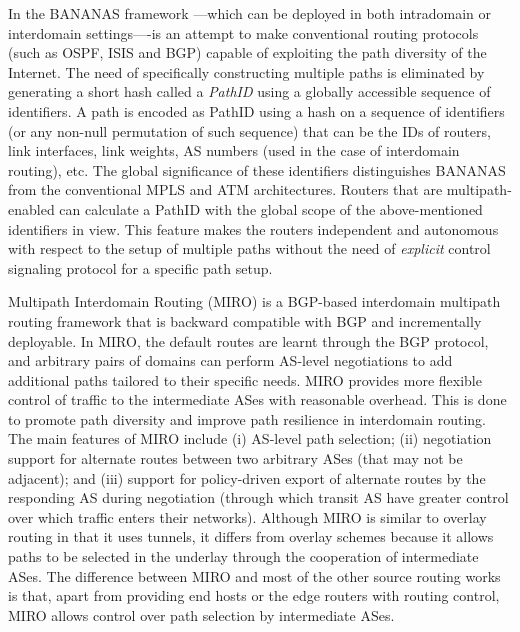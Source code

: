 \documentclass[10pt]{IEEEtran}
\begin{document}
In the BANANAS framework \cite{kaur2003bananas}---which can be deployed in both intradomain or interdomain settings----is an attempt to make  conventional routing protocols (such as OSPF, ISIS and BGP) capable of exploiting the path diversity of the Internet. The need of specifically constructing multiple paths is eliminated by generating a short hash called a \textit{PathID} using a globally accessible sequence of identifiers. A path is encoded as PathID using a hash on a sequence of identifiers (or any non-null permutation of such sequence) that can be the IDs of routers, link interfaces, link weights, AS numbers (used in the case of interdomain routing), etc.  The global significance of these identifiers distinguishes BANANAS from the conventional MPLS and ATM architectures. Routers that are multipath-enabled can calculate a PathID with the global scope of the above-mentioned identifiers in view. This feature makes the routers independent and autonomous with respect to the setup of multiple paths without the need of \textit{explicit} control signaling protocol for a specific path setup. 



Multipath Interdomain Routing (MIRO) \cite{xu2006miro} is a BGP-based interdomain multipath routing framework that is backward compatible with BGP and incrementally deployable. In MIRO, the default routes are learnt through the BGP protocol, and arbitrary pairs of domains can perform AS-level negotiations to add additional paths tailored to their specific needs. MIRO provides more flexible control of traffic to the intermediate ASes with reasonable overhead. This is done to promote path diversity and improve path resilience in interdomain routing. The main features of MIRO include (i) AS-level path selection; (ii) negotiation support for alternate routes between two arbitrary ASes (that may not be adjacent); and (iii) support for policy-driven export of alternate routes by the responding AS during negotiation (through which transit AS have greater control over which traffic enters their networks). Although MIRO is similar to overlay routing in that it uses tunnels, it differs from overlay schemes because it allows paths to be selected in the underlay through the cooperation of intermediate ASes. The difference between MIRO and most of the other source routing works is that, apart from providing end hosts or the edge routers with routing control, MIRO allows control over path selection by intermediate ASes. 
\end{document}
